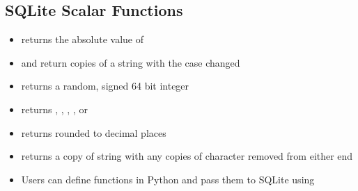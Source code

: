 \documentclass[a4paper]{article}
\begin{document}
\subsection{SQLite Scalar Functions}
\begin{itemize}
    \item {} returns the absolute value of 
    \item {} and  return copies of a string with the case changed
    \item {} returns a random, signed 64 bit integer
    \item {} returns , , , , or 
    \item {} returns  rounded to  decimal places
    \item {} returns a copy of string  with any copies of character  removed from either end
    \item Users can define functions in Python and pass them to SQLite using 
\end{itemize}
\end{document}
